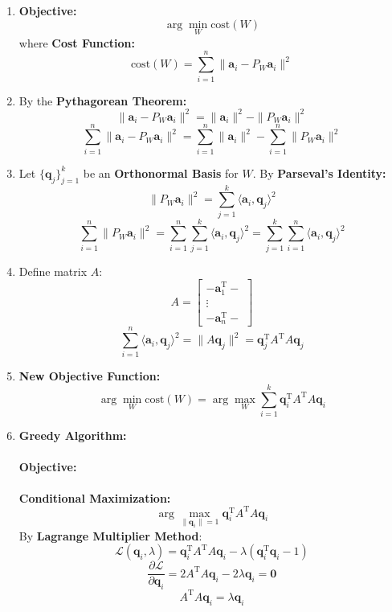 \documentclass{article}
\begin{document}
\begin{enumerate}
    \item \textbf{Objective:}
    \[
        \arg\min_{W} \text{cost}(W)
    \]
    where \textbf{Cost Function:}
    \[
        \text{cost}(W) = \sum_{i=1}^{n} \|\mathbf{a}_i - P_W \mathbf{a}_i\|^2
    \]

    \item By the \textbf{Pythagorean Theorem:}
    \[
        \|\mathbf{a}_i - P_W \mathbf{a}_i\|^2 = \|\mathbf{a}_i\|^2 - \|P_W \mathbf{a}_i\|^2
    \]
    \[
        \sum_{i=1}^{n} \|\mathbf{a}_i - P_W \mathbf{a}_i\|^2 = \sum_{i=1}^{n} \|\mathbf{a}_i\|^2 - \sum_{i=1}^{n} \|P_W \mathbf{a}_i\|^2
    \]

    \item Let $\{\mathbf{q}_j\}_{j=1}^{k}$ be an \textbf{Orthonormal Basis} for $W$.
    By \textbf{Parseval's Identity:}
    \[
        \|P_W \mathbf{a}_i\|^2 = \sum_{j=1}^{k} \langle \mathbf{a}_i, \mathbf{q}_j \rangle^2
    \]
    \[
        \sum_{i=1}^{n} \|P_W \mathbf{a}_i\|^2
        = \sum_{i=1}^{n} \sum_{j=1}^{k} \langle \mathbf{a}_i, \mathbf{q}_j \rangle^2
        = \sum_{j=1}^{k} \sum_{i=1}^{n} \langle \mathbf{a}_i, \mathbf{q}_j \rangle^2
    \]

    \item Define matrix $A$:
    \[
        A =
        \begin{bmatrix}
            - \mathbf{a}_1^{\mathrm{T}} - \\
            \vdots \\
            - \mathbf{a}_n^{\mathrm{T}} -
        \end{bmatrix}
    \]
    \[
        \sum_{i=1}^{n} \langle \mathbf{a}_i, \mathbf{q}_j \rangle^2 = \|A\mathbf{q}_j\|^2 = \mathbf{q}_{j}^{\mathrm{T}} A^{\mathrm{T}} A \mathbf{q}_j
    \]

    \item \textbf{New Objective Function:}
    \[
        \arg\min_{W} \text{cost}(W) = \arg\max_{W} \sum_{i=1}^{k} \mathbf{q}_i^{\mathrm{T}} A^{\mathrm{T}} A \mathbf{q}_i
    \]

    \item \textbf{Greedy Algorithm:}
    \paragraph{Objective:} \textbf{Conditional Maximization:}
    \[
        \arg\max_{\|\mathbf{q}_i\|=1} \mathbf{q}_i^{\mathrm{T}} A^{\mathrm{T}} A \mathbf{q}_i
    \]
    By \textbf{Lagrange Multiplier Method}:
    \[
        \mathcal{L}(\mathbf{q}_i, \lambda) = \mathbf{q}_i^{\mathrm{T}} A^{\mathrm{T}} A \mathbf{q}_i - \lambda(\mathbf{q}_i^{\mathrm{T}} \mathbf{q}_i - 1)
    \]
    \[
        \frac{\partial \mathcal{L}}{\partial \mathbf{q}_i} = 2 A^{\mathrm{T}} A \mathbf{q}_i - 2\lambda\mathbf{q}_i = \mathbf{0}
    \]
    \[
        A^{\mathrm{T}} A \mathbf{q}_i = \lambda\mathbf{q}_i
    \]

\end{enumerate}
\end{document}

